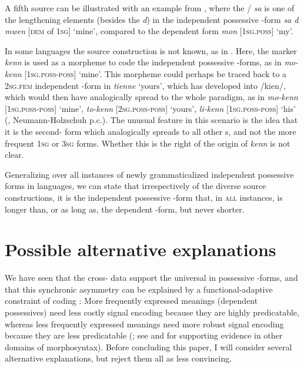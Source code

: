 \documentclass[output=paper]{langsci/langscibook}
\begin{document}
A fifth source can be illustrated with an example from , where the  / \textit{sa} is one of the lengthening elements (besides the   \textit{d}) in the independent possessive -form \textit{sa d mwen} [\textsc{dem} of \textsc{1sg}] ‘mine’, compared to the dependent form \textit{mon} [\textsc{1sg.poss}] ‘my’.

In some  languages the source construction is not known, as in . Here, the marker \textit{kenn} is used as a morpheme to code the independent possessive -forms, as in \textit{mo-kenn} [\textsc{1sg.poss-poss}] ‘mine’. This morpheme could perhaps be traced back to a \textsc{2sg.fem} independent -form in  \textit{tienne} ‘yours’, which has developed into /kien/, which would then have analogically spread to the whole paradigm, as in \textit{mo-kenn} [\textsc{1sg.poss-poss}] ‘mine’, \textit{to-kenn} [\textsc{2sg.poss-poss}] ‘yours’, \textit{li-kenn} [\textsc{1sg.poss-poss}] ‘his’ (\citealt{Neumann-HolzschuhKlingler2013}, Neumann-Holzschuh p.c.). The unusual feature in this scenario is the idea that it is the second- form which analogically spreads to all other s, and not the more frequent \textsc{1sg} or \textsc{3sg} forms. Whether this is the right  of the origin of \textit{kenn} is not clear.

Generalizing over all instances of newly grammaticalized independent possessive forms in  languages, we can state that irrespectively of the diverse source constructions, it is the independent possessive -form that, in \textsc{all} instances, is longer than, or as long as, the dependent -form, but never shorter.


\section{Possible alternative explanations}\label{sec:michaelis:5}

We have seen that the cross- data support the universal  in possessive -forms, and that this synchronic asymmetry can be explained by a functional-adaptive constraint of coding : More frequently expressed meanings (dependent possessives) need less costly signal encoding because they are highly predicatable, whereas less frequently expressed meanings need more robust signal encoding because they are less predicatable (; see \citealt{NorcliffeJaeger2016} and \citealt{JaegerBuz2018} for supporting  evidence in other domains of morphosyntax). Before concluding this paper, I will consider several alternative explanations, but reject them all as less convincing.
\end{document}
